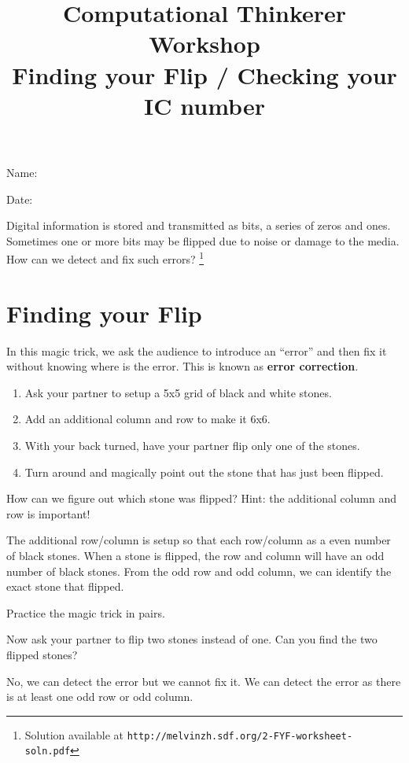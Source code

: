 \documentclass[a4paper,12pt]{article}
\title{Computational Thinkerer Workshop\\
Finding your Flip / Checking your IC number
\vspace{-2cm}}
\date{}
\newcommand\Blank[2][.33\linewidth]{%
  \rule{0pt}{4ex}%
  #2\enspace
  \makebox[#1]{\hrulefill}}
\begin{document}
\maketitle
\begin{flushright}
  \Blank{Name:}

  \Blank{Date:}
\end{flushright}

Digital information is stored and transmitted as bits, a series of
zeros and ones. Sometimes one or more bits may be flipped due to noise or damage
to the media. How can we detect and fix such errors?
\let\thefootnote\relax\footnote{Solution available at \texttt{http://melvinzh.sdf.org/2-FYF-worksheet-soln.pdf}}

\section*{Finding your Flip}
In this magic trick, we ask the audience to introduce an ``error'' and then fix
it without knowing where is the error. This is known as \textbf{error correction}.
\begin{enumerate}
    \item Ask your partner to setup a 5x5 grid of black and white stones.
    \item Add an additional column and row to make it 6x6.
    \item With your back turned, have your partner flip only one of the stones.
    \item Turn around and magically point out the stone that has just been flipped.
\end{enumerate}

\begin{question}[skip-below=3\baselineskip]
How can we figure out which stone was flipped? Hint: the additional column and row is important!
\end{question}
\begin{solution}
The additional row/column is setup so that each row/column as a even number of black stones.
When a stone is flipped, the row and column will have an odd number of black stones.
From the odd row and odd column, we can identify the exact stone that flipped.  
\end{solution}

\begin{question}[skip-below=3\baselineskip]
Practice the magic trick in pairs.
\end{question}

\begin{question}[skip-below=3\baselineskip,name=Advance exercise]
Now ask your partner to flip two stones instead of one. Can you find the two flipped stones?
\end{question}
\begin{solution}
No, we can detect the error but we cannot fix it. We can detect the error as
there is at least one odd row or odd column.  
\end{solution}
\end{document}
